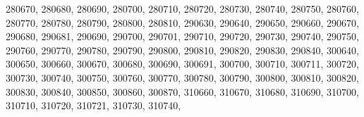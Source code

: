 \textquotesingle{}280670\textquotesingle{}, \textquotesingle{}280680\textquotesingle{}, \textquotesingle{}280690\textquotesingle{}, \textquotesingle{}280700\textquotesingle{}, \textquotesingle{}280710\textquotesingle{}, \textquotesingle{}280720\textquotesingle{}, \textquotesingle{}280730\textquotesingle{}, \textquotesingle{}280740\textquotesingle{}, \textquotesingle{}280750\textquotesingle{}, \textquotesingle{}280760\textquotesingle{}, \textquotesingle{}280770\textquotesingle{}, \textquotesingle{}280780\textquotesingle{}, \textquotesingle{}280790\textquotesingle{}, \textquotesingle{}280800\textquotesingle{}, \textquotesingle{}280810\textquotesingle{}, \textquotesingle{}290630\textquotesingle{}, \textquotesingle{}290640\textquotesingle{}, \textquotesingle{}290650\textquotesingle{}, \textquotesingle{}290660\textquotesingle{}, \textquotesingle{}290670\textquotesingle{}, \textquotesingle{}290680\textquotesingle{}, \textquotesingle{}290681\textquotesingle{}, \textquotesingle{}290690\textquotesingle{}, \textquotesingle{}290700\textquotesingle{}, \textquotesingle{}290701\textquotesingle{}, \textquotesingle{}290710\textquotesingle{}, \textquotesingle{}290720\textquotesingle{}, \textquotesingle{}290730\textquotesingle{}, \textquotesingle{}290740\textquotesingle{}, \textquotesingle{}290750\textquotesingle{}, \textquotesingle{}290760\textquotesingle{}, \textquotesingle{}290770\textquotesingle{}, \textquotesingle{}290780\textquotesingle{}, \textquotesingle{}290790\textquotesingle{}, \textquotesingle{}290800\textquotesingle{}, \textquotesingle{}290810\textquotesingle{}, \textquotesingle{}290820\textquotesingle{}, \textquotesingle{}290830\textquotesingle{}, \textquotesingle{}290840\textquotesingle{}, \textquotesingle{}300640\textquotesingle{}, \textquotesingle{}300650\textquotesingle{}, \textquotesingle{}300660\textquotesingle{}, \textquotesingle{}300670\textquotesingle{}, \textquotesingle{}300680\textquotesingle{}, \textquotesingle{}300690\textquotesingle{}, \textquotesingle{}300691\textquotesingle{}, \textquotesingle{}300700\textquotesingle{}, \textquotesingle{}300710\textquotesingle{}, \textquotesingle{}300711\textquotesingle{}, \textquotesingle{}300720\textquotesingle{}, \textquotesingle{}300730\textquotesingle{}, \textquotesingle{}300740\textquotesingle{}, \textquotesingle{}300750\textquotesingle{}, \textquotesingle{}300760\textquotesingle{}, \textquotesingle{}300770\textquotesingle{}, \textquotesingle{}300780\textquotesingle{}, \textquotesingle{}300790\textquotesingle{}, \textquotesingle{}300800\textquotesingle{}, \textquotesingle{}300810\textquotesingle{}, \textquotesingle{}300820\textquotesingle{}, \textquotesingle{}300830\textquotesingle{}, \textquotesingle{}300840\textquotesingle{}, \textquotesingle{}300850\textquotesingle{}, \textquotesingle{}300860\textquotesingle{}, \textquotesingle{}300870\textquotesingle{}, \textquotesingle{}310660\textquotesingle{}, \textquotesingle{}310670\textquotesingle{}, \textquotesingle{}310680\textquotesingle{}, \textquotesingle{}310690\textquotesingle{}, \textquotesingle{}310700\textquotesingle{}, \textquotesingle{}310710\textquotesingle{}, \textquotesingle{}310720\textquotesingle{}, \textquotesingle{}310721\textquotesingle{}, \textquotesingle{}310730\textquotesingle{}, \textquotesingle{}310740\textquotesingle{}, 